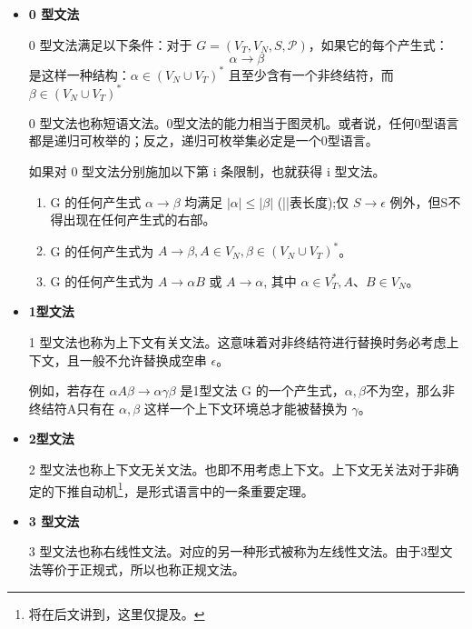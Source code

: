 \begin{itemize}
	\item \textbf{0 型文法}

	      0 型文法满足以下条件：对于 $G=(V_T,V_N,S,\mathcal{P})$，如果它的每个产生式：
	      \[\alpha \rightarrow \beta\]
	      是这样一种结构：$\alpha \in (V_N \cup V_T)^*$ 且至少含有一个非终结符，而 $\beta \in (V_N \cup V_T)^*$

	      0 型文法也称短语文法。0型文法的能力相当于图灵机。或者说，任何0型语言都是递归可枚举的；反之，递归可枚举集必定是一个0型语言。

	      如果对 0 型文法分别施加以下第 i 条限制，也就获得 i 型文法。
	      \begin{enumerate}
		      \item G 的任何产生式 $\alpha \rightarrow \beta$ 均满足 $|\alpha| \leq |\beta|$ (||表长度);仅 $S \rightarrow \epsilon$ 例外，但S不得出现在任何产生式的右部。
		      \item G 的任何产生式为 $A\rightarrow \beta,A\in V_N,\beta \in (V_N \cup V_T)^*$。
		      \item G 的任何产生式为 $A\rightarrow\alpha B$ 或 $A \rightarrow \alpha$, 其中 $\alpha \in V_T^*,A、B\in V_N$。
	      \end{enumerate}

	\item \textbf{1型文法}

	      1 型文法也称为上下文有关文法。这意味着对非终结符进行替换时务必考虑上下文，且一般不允许替换成空串 $\epsilon$。

	      例如，若存在 $\alpha A \beta \rightarrow \alpha \gamma \beta$ 是1型文法 G 的一个产生式，$\alpha,\beta$不为空，那么非终结符A只有在 $\alpha,\beta$ 这样一个上下文环境总才能被替换为 $\gamma$。

	\item \textbf{2型文法}

	      2 型文法也称上下文无关文法。也即不用考虑上下文。上下文无关法对于非确定的下推自动机\footnote{将在后文讲到，这里仅提及。}，是形式语言中的一条重要定理。

	\item \textbf{3 型文法}

	      3 型文法也称右线性文法。对应的另一种形式被称为左线性文法。由于3型文法等价于正规式，所以也称正规文法。
\end{itemize}